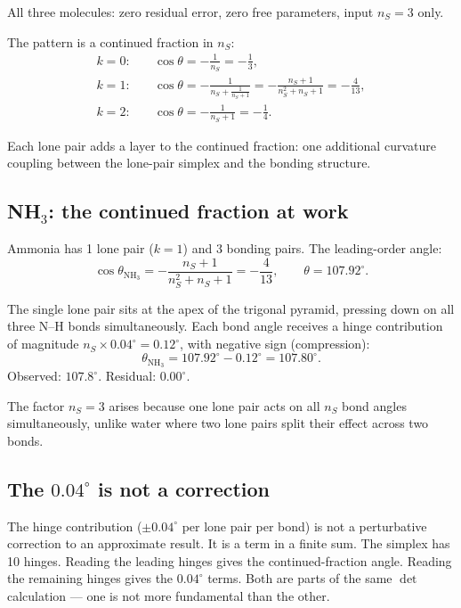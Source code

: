 \documentclass[12pt]{article}
\theoremstyle{remark}
\begin{document}
\noindent All three molecules: zero residual error, zero free parameters, input $n_S = 3$ only.

The pattern is a continued fraction in $n_S$:
\begin{align}
k = 0:\quad & \cos\theta = -\frac{1}{n_S} = -\frac{1}{3}, \\[6pt]
k = 1:\quad & \cos\theta = -\frac{1}{n_S + \frac{1}{n_S + 1}} = -\frac{n_S + 1}{n_S^2 + n_S + 1} = -\frac{4}{13}, \\[6pt]
k = 2:\quad & \cos\theta = -\frac{1}{n_S + 1} = -\frac{1}{4}.
\end{align}

Each lone pair adds a layer to the continued fraction: one additional curvature coupling between the lone-pair simplex and the bonding structure.

\subsection{NH$_3$: the continued fraction at work}

Ammonia has 1 lone pair ($k = 1$) and 3 bonding pairs. The leading-order angle:
\begin{equation}
\cos\theta_{\text{NH}_3} = -\frac{n_S + 1}{n_S^2 + n_S + 1} = -\frac{4}{13}, \qquad \theta = 107.92^\circ.
\end{equation}

The single lone pair sits at the apex of the trigonal pyramid, pressing down on all three N--H bonds simultaneously. Each bond angle receives a hinge contribution of magnitude $n_S \times 0.04^\circ = 0.12^\circ$, with negative sign (compression):
\begin{equation}
\theta_{\text{NH}_3} = 107.92^\circ - 0.12^\circ = 107.80^\circ.
\end{equation}
Observed: $107.8^\circ$. Residual: $0.00^\circ$.

The factor $n_S = 3$ arises because one lone pair acts on all $n_S$ bond angles simultaneously, unlike water where two lone pairs split their effect across two bonds.

\subsection{The $0.04^\circ$ is not a correction}

The hinge contribution ($\pm 0.04^\circ$ per lone pair per bond) is not a perturbative correction to an approximate result. It is a term in a finite sum. The simplex has 10 hinges. Reading the leading hinges gives the continued-fraction angle. Reading the remaining hinges gives the $0.04^\circ$ terms. Both are parts of the same $\det$ calculation --- one is not more fundamental than the other.
\end{document}
